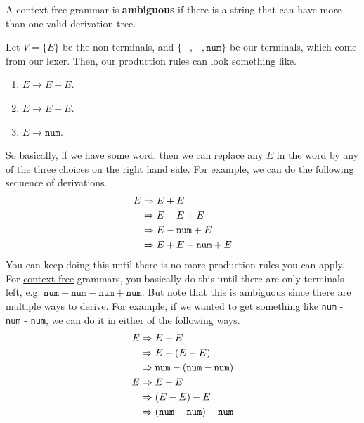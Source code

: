   \begin{definition}[Ambiguous]
    \label{def:ambiguous}
    A context-free grammar is \textbf{ambiguous} if there is a string that can have more than one valid derivation tree. 
  \end{definition}

  \begin{example}
    \label{ex:ambiguous-context-free-grammar}
    Let $V = \{E\}$ be the non-terminals, and $\{+, -, \texttt{num}\}$ be our terminals, which come from our lexer. Then, our production rules can look something like. 
    \begin{enumerate}
      \item $E \to E + E$. 
      \item $E \to E - E$. 
      \item $E \to \texttt{num}$. 
    \end{enumerate}
    So basically, if we have some word, then we can replace any $E$ in the word by any of the three choices on the right hand side. For example, we can do the following sequence of derivations. 
    \begin{align}
      E & \Rightarrow E + E \\ 
        & \Rightarrow E - E + E \\
        & \Rightarrow E - \texttt{num} + E\\
        & \Rightarrow E + E - \texttt{num} + E 
    \end{align}
    You can keep doing this until there is no more production rules you can apply. For \hyperref[def:context-free]{context free} grammars, you basically do this until there are only terminals left, e.g. $\texttt{num} + \texttt{num} - \texttt{num} + \texttt{num}$. But note that this is ambiguous since there are multiple ways to derive. For example, if we wanted to get something like \texttt{num} - \texttt{num} - \texttt{num}, we can do it in either of the following ways. 
    \begin{align}
      E & \Rightarrow E - E \\ 
        & \Rightarrow E - (E - E) \\ 
        & \Rightarrow \texttt{num} - (\texttt{num} - \texttt{num}) \\
      E & \Rightarrow E - E \\ 
        & \Rightarrow (E - E) - E \\ 
        & \Rightarrow (\texttt{num} - \texttt{num}) - \texttt{num} 
    \end{align}
  \end{example}

